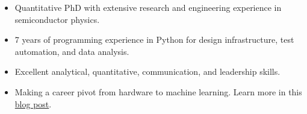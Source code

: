 

\begin{cvparagraph}

\begin{itemize}[leftmargin=*, noitemsep]
    \item Quantitative PhD with extensive research and engineering experience in semiconductor physics. 
    \item 7 years of programming experience in Python for design infrastructure, test automation, and data analysis. 
    \item Excellent analytical, quantitative, communication, and leadership skills. 
    \item Making a career pivot from hardware to machine learning. Learn more in this \href{https://medium.com/@mpchang17/making-the-leap-from-hardware-to-machine-learning-d85853b59a05}{blog post}.
\end{itemize}
\end{cvparagraph}
